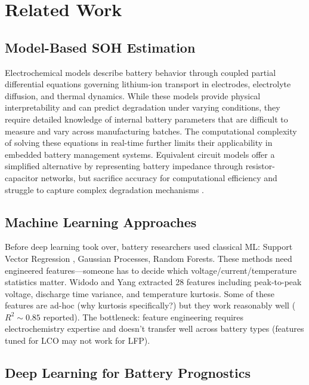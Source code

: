 \documentclass{sn-jnl}
\begin{document}
\section{Related Work}
\label{sec:related}

\subsection{Model-Based SOH Estimation}
\label{subsec:model}

Electrochemical models describe battery behavior through coupled partial differential equations governing lithium-ion transport in electrodes, electrolyte diffusion, and thermal dynamics. While these models provide physical interpretability and can predict degradation under varying conditions, they require detailed knowledge of internal battery parameters that are difficult to measure and vary across manufacturing batches. The computational complexity of solving these equations in real-time further limits their applicability in embedded battery management systems. Equivalent circuit models offer a simplified alternative by representing battery impedance through resistor-capacitor networks, but sacrifice accuracy for computational efficiency and struggle to capture complex degradation mechanisms \citep{han2014}.

\subsection{Machine Learning Approaches}
\label{subsec:ml}

Before deep learning took over, battery researchers used classical ML: Support Vector Regression \citep{widodo2011}, Gaussian Processes, Random Forests. These methods need engineered features—someone has to decide which voltage/current/temperature statistics matter. Widodo and Yang extracted 28 features including peak-to-peak voltage, discharge time variance, and temperature kurtosis. Some of these features are ad-hoc (why kurtosis specifically?) but they work reasonably well ($R^2 \sim 0.85$ reported). The bottleneck: feature engineering requires electrochemistry expertise and doesn't transfer well across battery types (features tuned for LCO may not work for LFP).

\subsection{Deep Learning for Battery Prognostics}
\label{subsec:dl}
\end{document}
